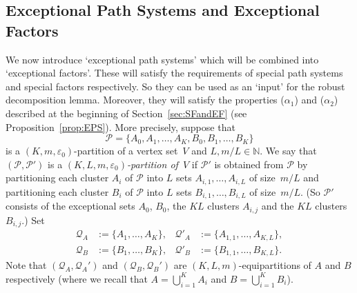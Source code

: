 \documentclass{memo-l}
\def\cP{\mathcal{P}}
\def\eps{\varepsilon}
\def\epszero{\eps_0}
\numberwithin{section}{chapter}
\numberwithin{equation}{section}
\numberwithin{firstthm}{section}
\numberwithin{figure}{section}
\begin{document}
\subsection{Exceptional Path Systems and Exceptional Factors}\label{sec:BEPS}
We now introduce `exceptional path systems' which will be combined into `exceptional factors'.
These will satisfy the requirements of special path systems and special factors respectively.
So they can be used as an `input' for the robust decomposition lemma.
Moreover, they will satisfy the properties ($\alpha_1$) and ($\alpha_2$) described at the beginning of Section~\ref{sec:SFandEF}
(see Proposition~\ref{prop:EPS}).
More precisely, suppose that 
$$
\mathcal{P}=\{A_0,A_1,\dots,A_K,B_0,B_1,\dots,B_K\}
$$ is a $(K,m,\eps_0)$-partition of a vertex set~$V$ and $L,m/L\in\mathbb{N}$.
We say that $(\mathcal{P},\mathcal{P'})$ is a \emph{$(K, L, m, \epszero)$-partition of~$V$} if $\mathcal{P'}$ is 
obtained from $\mathcal{P}$ by partitioning each cluster $A_i$ of $\mathcal{P}$
into $L$ sets $A_{i,1},\dots,A_{i,L}$ of size~$m/L$ and partitioning each cluster $B_i$ of $\mathcal{P}$ into $L$ sets $B_{i,1},\dots,B_{i,L}$ of size~$m/L$.
(So $\cP'$ consists of the exceptional sets $A_0$, $B_0$, the $KL$ clusters $A_{i,j}$ and the $KL$ clusters $B_{i,j}$.)
Set 
\begin{align}
\mathcal{Q}_A & := \{A_1, \dots, A_K\}, & 
\mathcal{Q}'_A &:= \{A_{1,1}, \dots, A_{K,L}\}, \label{defparts}\\ 
\mathcal{Q}_B &:= \{B_1, \dots, B_K\}, &
\mathcal{Q}'_B & := \{B_{1,1}, \dots, B_{K,L}\}\nonumber. 
\end{align}
Note that $(\mathcal{Q}_A, \mathcal{Q}_A')$ and $(\mathcal{Q}_B, \mathcal{Q}_B')$ are $(K,L,m)$-equipartitions of $A$ and $B$ respectively
(where we recall that $A = \bigcup_{i=1}^K A_i$ and $B = \bigcup_{i=1}^K B_i$).
\end{document}
